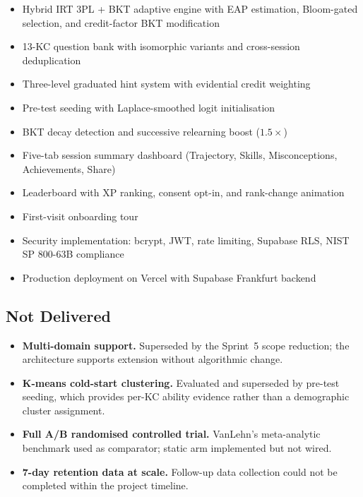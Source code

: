 \begin{itemize}[leftmargin=2em]
  \item Hybrid IRT 3PL + BKT adaptive engine with EAP estimation,
        Bloom-gated selection, and credit-factor BKT modification
  \item 13-KC question bank with isomorphic variants and cross-session deduplication
  \item Three-level graduated hint system with evidential credit weighting
  \item Pre-test seeding with Laplace-smoothed logit initialisation
  \item BKT decay detection and successive relearning boost ($1.5\times$)
  \item Five-tab session summary dashboard (Trajectory, Skills, Misconceptions, Achievements, Share)
  \item Leaderboard with XP ranking, consent opt-in, and rank-change animation
  \item First-visit onboarding tour
  \item Security implementation: bcrypt, JWT, rate limiting, Supabase RLS, NIST SP 800-63B compliance
  \item Production deployment on Vercel with Supabase Frankfurt backend
\end{itemize}

\subsection{Not Delivered}

\begin{itemize}[leftmargin=2em]
  \item \textbf{Multi-domain support.} Superseded by the Sprint~5 scope
        reduction; the architecture supports extension without algorithmic change.
  \item \textbf{K-means cold-start clustering.} Evaluated and superseded by
        pre-test seeding, which provides per-KC ability evidence rather than
        a demographic cluster assignment.
  \item \textbf{Full A/B randomised controlled trial.} VanLehn's meta-analytic
        benchmark used as comparator; static arm implemented but not wired.
  \item \textbf{7-day retention data at scale.} Follow-up data collection could
        not be completed within the project timeline.
\end{itemize}

